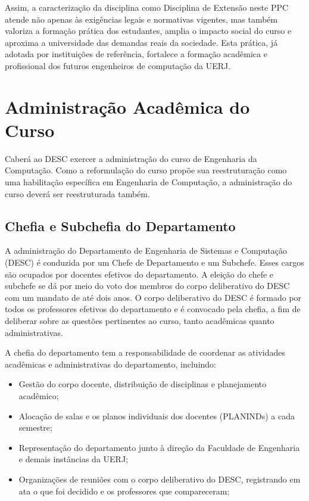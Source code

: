 Assim, a caracterização da disciplina \textbf{\EstSup} como Disciplina de Extensão neste PPC atende não apenas às exigências legais e normativas vigentes, mas também valoriza a formação prática dos estudantes, amplia o impacto social do curso e aproxima a universidade das demandas reais da sociedade. Esta prática, já adotada por instituições de referência, fortalece a formação acadêmica e profissional dos futuros engenheiros de computação da UERJ.


\section{Administração Acadêmica do Curso}

Caberá ao DESC exercer a administração do curso de Engenharia da Computação.
Como a reformulação do curso propõe sua reestruturação como uma habilitação específica em Engenharia de Computação, a administração do curso deverá ser reestruturada também.

\subsection{Chefia e Subchefia do Departamento}

A administração do Departamento de Engenharia de Sistemas e Computação (DESC) é conduzida por um Chefe de Departamento e um Subchefe. Esses cargos são ocupados por docentes efetivos do departamento. A eleição do chefe e subchefe se dá por meio do voto dos membros do corpo deliberativo do DESC com um mandato de até dois anos. O corpo deliberativo do DESC é formado por todos os professores efetivos do departamento e é convocado pela chefia, a fim de deliberar sobre as questões pertinentes ao curso, tanto acadêmicas quanto administrativas.

A chefia do departamento tem a responsabilidade de coordenar as atividades acadêmicas e administrativas do departamento, incluindo:

\begin{itemize}
    \item Gestão do corpo docente, distribuição de disciplinas e planejamento acadêmico;
    \item Alocação de salas e os planos individuais dos docentes (PLANINDs) a cada semestre;
    \item Representação do departamento junto à direção da Faculdade de Engenharia e demais instâncias da UERJ;
    \item Organizações de reuniões com o corpo deliberativo do DESC, registrando em ata o que foi decidido e os professores que compareceram;
\end{itemize}

